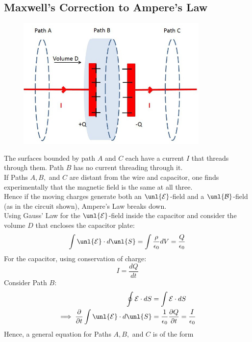 \documentclass[a4paper, 11pt, normalem]{report}
\newcommand\p{\partial}
\newcommand\E{\mathcal{E}}
\newcommand\uE{\unl{\E}}
\newcommand\B{\mathcal{B}}
\newcommand\uB{\unl{\B}}
\newcommand\eno{\epsilon_0}
\begin{document}
\subsection{Maxwell's Correction to Ampere's Law}
\begin{figure}
    \begin{center}
        \vspace{-40pt}
        \includegraphics[scale=0.4]{cap4.png}
    \end{center}
\end{figure}
The surfaces bounded by path $A$ and $C$ each have a current $I$ that threads through them.
Path $B$ has no current threading through it. \\
If Paths $A,B,$ and $C$ are distant from the wire and capacitor, one finds experimentally that the magnetic field is the same at all three. \\
Hence if the moving charges generate both an $\uE$-field and a $\uB$-field (as in the circuit shown), Ampere's Law breaks down. \\
Using Gauss' Law for the $\uE$-field inside the capacitor and consider the volume $D$ that encloses the capacitor plate:
\begin{equation}
    \int \uE \cdot d\unl{S} = \int \frac{\rho}{\eno}dV = \frac{Q}{\eno}
\end{equation}
For the capacitor, using conservation of charge:
\begin{equation}
    I = \frac{dQ}{dt}
\end{equation}
Consider Path $B$:
\begin{align}
    \oint \E \cdot dS &= \int \E \cdot dS \\
    \implies \frac{\p}{\p t} \int \uE \cdot d\unl{S} &= \frac{1}{\eno}\frac{\p Q}{\p t} = \frac{I}{\eno}
\end{align}
Hence, a general equation for Paths $A,B,$ and $C$ is of the form
\end{document}
